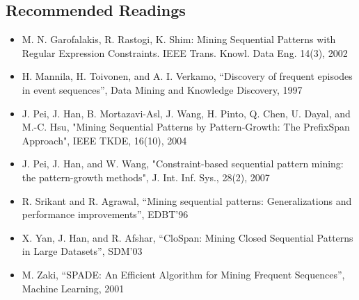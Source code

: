 \subsection{Recommended Readings}
\begin{itemize}
\item M. N. Garofalakis, R. Rastogi, K. Shim: Mining Sequential Patterns with Regular Expression Constraints. IEEE Trans. Knowl. Data Eng. 14(3), 2002
\item H. Mannila, H. Toivonen, and A. I. Verkamo, “Discovery of frequent episodes in event sequences”, Data Mining and Knowledge Discovery, 1997
\item J. Pei, J. Han, B. Mortazavi-Asl, J. Wang, H. Pinto, Q. Chen, U. Dayal, and M.-C. Hsu, "Mining Sequential Patterns by Pattern-Growth: The PrefixSpan Approach", IEEE TKDE, 16(10), 2004
\item J. Pei, J. Han, and W. Wang, "Constraint-based sequential pattern mining: the pattern-growth methods", J. Int. Inf. Sys., 28(2), 2007
\item R. Srikant and R. Agrawal, “Mining sequential patterns: Generalizations and performance improvements”, EDBT’96
\item X. Yan, J. Han, and R. Afshar, “CloSpan: Mining Closed Sequential Patterns in Large Datasets”, SDM'03
\item M. Zaki, “SPADE: An Efficient Algorithm for Mining Frequent Sequences”, Machine Learning, 2001
\end{itemize}

